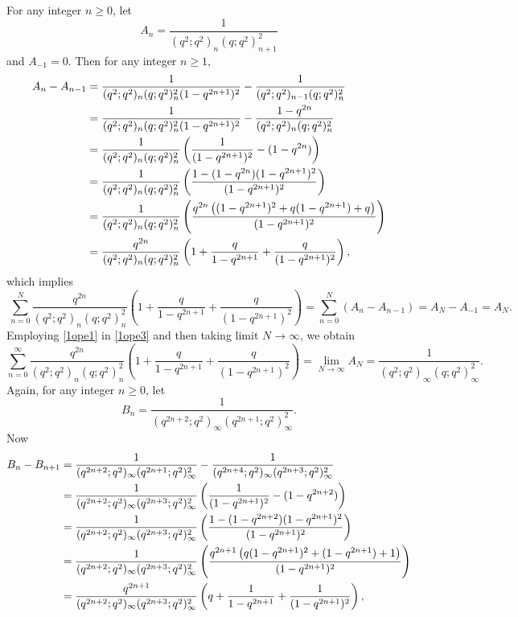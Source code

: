 \documentclass[12pt]{article}
\numberwithin{equation}{section}
\theoremstyle{definition}
\theoremstyle{remark}
\numberwithin{equation}{section}
\begin{document}
For any  integer $n\ge 0$, let
\begin{equation}\label{1ope1}
A_n=\dfrac{1}{(q^2;q^2)_n(q;q^2)_{n+1}^2}
\end{equation}
and $A_{-1}=0$. Then for any integer $n\geq1$,
\begin{align}
   A_n-A_{n-1}&=\dfrac{1}{(q^2;q^2)_n(q;q^2)_n^2(1-q^{2n+1})^2}-\dfrac{1}{(q^2;q^2)_{n-1}(q;q^2)_n^2}\notag\\
   &=\dfrac{1}{(q^2;q^2)_n(q;q^2)_n^2(1-q^{2n+1})^2}-\dfrac{1-q^{2n}}{(q^2;q^2)_n(q;q^2)_n^2}\notag\\
   &=\dfrac{1}{(q^2;q^2)_n(q;q^2)_n^2}
\left(
\dfrac{1}{(1-q^{2n+1})^2}-(1-q^{2n})
\right)\notag\\
&=\dfrac{1}{(q^2;q^2)_n(q;q^2)_n^2}\left(\dfrac{1-(1-q^{2n})(1-q^{2n+1})^2}{(1-q^{2n+1})^2}\right)\notag\\
&=\dfrac{1}{(q^2;q^2)_n(q;q^2)_n^2}\left(\dfrac{q^{2n}\left((1-q^{2n+1})^2+q(1-q^{2n+1})+q\right)}{(1-q^{2n+1})^2}\right)\notag\\
&=\dfrac{q^{2n}}{(q^2;q^2)_n(q;q^2)_n^2}
\left(
1+\dfrac{q}{1-q^{2n+1}}
+\dfrac{q}{(1-q^{2n+1})^2}
\right), \notag
\end{align}
which implies
\begin{equation}\label{1ope3}\
\sum_{n=0}^{N}
\dfrac{q^{2n}}{(q^2;q^2)_n(q;q^2)_n^2}
\left(
1+\dfrac{q}{1-q^{2n+1}}
+\dfrac{q}{(1-q^{2n+1})^2}
\right)
=\sum_{n=0}^{N}(A_n-A_{n-1})
=A_N-A_{-1}=A_N.
\end{equation}
Employing  \eqref{1ope1} in \eqref{1ope3} and then taking limit $N\rightarrow\infty$, we obtain
\begin{equation}\label{1ope4}\sum_{n=0}^{\infty}
\dfrac{q^{2n}}{(q^2;q^2)_n(q;q^2)_n^2}
\left(
1+\dfrac{q}{1-q^{2n+1}}
+\dfrac{q}{(1-q^{2n+1})^2}
\right)
=\lim_{N\to\infty} A_N=\dfrac{1}{(q^2;q^2)_\infty(q;q^2)_\infty^2}.
\end{equation}
Again,   for any integer $n\ge 0$, let
\begin{equation}\label{bn}B_n=
\dfrac{1}{(q^{2n+2};q^2)_\infty(q^{2n+1};q^2)_\infty^2}.\end{equation}
Now
\begin{align}
B_n-B_{n+1}
&=
\dfrac{1}{(q^{2n+2};q^2)_\infty(q^{2n+1};q^2)_\infty^2}
-
\dfrac{1}{(q^{2n+4};q^2)_\infty(q^{2n+3};q^2)_\infty^2}
\notag\\
&=
\dfrac{1}{(q^{2n+2};q^2)_\infty(q^{2n+3};q^2)_\infty^2}
\left(
\dfrac{1}{(1-q^{2n+1})^2}
-(1-q^{2n+2})
\right)
\notag\\
&=
\dfrac{1}{(q^{2n+2};q^2)_\infty(q^{2n+3};q^2)_\infty^2}
\left(
\dfrac{1-(1-q^{2n+2})(1-q^{2n+1})^2}{(1-q^{2n+1})^2}
\right)
\notag\\
&=
\dfrac{1}{(q^{2n+2};q^2)_\infty(q^{2n+3};q^2)_\infty^2}
\left(
\dfrac{
q^{2n+1}
\left(
q(1-q^{2n+1})^2+(1-q^{2n+1})+1
\right)
}
{(1-q^{2n+1})^2}
\right)
\notag\\
&=
\dfrac{q^{2n+1}}{(q^{2n+2};q^2)_\infty(q^{2n+3};q^2)_\infty^2}
\left(
q+\dfrac{1}{1-q^{2n+1}}
+\dfrac{1}{(1-q^{2n+1})^2}
\right), \notag
\end{align}
\end{document}
